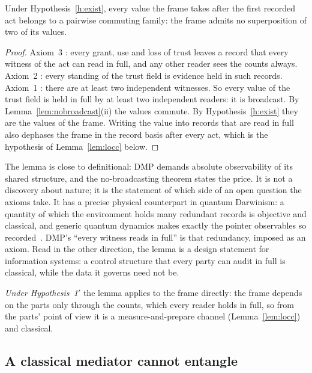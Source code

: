 \begin{lemma}\label{lem:classical}
Under Hypothesis~\ref{h:exist}, every value the frame takes after the first recorded act belongs to a pairwise commuting family:
the frame admits no superposition of two of its values.
\end{lemma}

\begin{proof}
Axiom~3 \tagD: every grant, use and loss of trust leaves a record that every witness of the act can read in full, and any other reader sees
the counts always. Axiom~2 \tagD: every standing of the trust field is evidence held in such records. Axiom~1 \tagD: there are at least two
independent witnesses. So every value of the trust field is held in full by at least two independent readers: it is broadcast. By
Lemma~\ref{lem:nobroadcast}(ii) the values commute. By Hypothesis~\ref{h:exist} they are the values of the frame. Writing the
value into records that are read in full also dephases the frame in the record basis after every act, which is the hypothesis of
Lemma~\ref{lem:locc} below.
\end{proof}

\begin{remark}
The lemma is close to definitional: DMP demands absolute observability of its shared structure, and the no-broadcasting theorem states the
price. It is not a discovery about nature; it is the statement of which side of an open question the axioms take. It has a precise physical
counterpart in quantum Darwinism: a quantity of which the environment holds many redundant records is objective and classical, and generic
quantum dynamics makes exactly the pointer observables so recorded~\cite{zurek,bph}. DMP's ``every witness reads in full'' is that
redundancy, imposed as an axiom. Read in the other direction, the lemma is a design statement for information systems: a control structure
that every party can audit in full is classical, while the data it governs need not be.
\end{remark}

\noindent \emph{Under Hypothesis~1$'$} the lemma applies to the frame directly: the frame depends on the parts only through the
counts, which every reader holds in full, so from the parts' point of view it is a measure-and-prepare channel (Lemma~\ref{lem:locc}) and
classical.

\subsection{A classical mediator cannot entangle}

